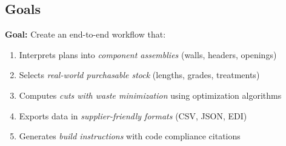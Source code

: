 \subsection{Goals}

\textbf{Goal:} Create an end-to-end workflow that:
\begin{enumerate}
  \item[(a)] Interprets plans into \emph{component assemblies} (walls, headers, openings)
  \item[(b)] Selects \emph{real-world purchasable stock} (lengths, grades, treatments)
  \item[(c)] Computes \emph{cuts with waste minimization} using optimization algorithms
  \item[(d)] Exports data in \emph{supplier-friendly formats} (CSV, JSON, EDI)
  \item[(e)] Generates \emph{build instructions} with code compliance citations
\end{enumerate}
